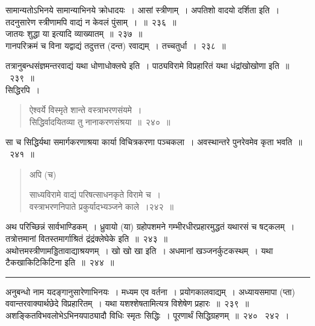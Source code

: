 \documentclass[11pt, openany]{book}
\begin{document}
सामान्यतोऽभिनये सामान्याभिनये क्रोधादयः~। आसां स्त्रीणाम्~। अपतिशो वादयो दर्शिता इति~। तदनुसारेण स्त्रीणामपि वाद्यं न केवलं पुंसाम्~।~॥~२३६~॥\\

जातयः शुद्धा या इत्यादि व्याख्यातम्~॥~२३७~॥\\

गानपरिक्रमं च विना यद्वाद्यं तदुत्तत्त (दन्त) रवाद्यम्~। तच्चतुर्धा~।~२३८~॥

\newpage

{\qt तत्रानुबन्धसंज्ञमन्तरवाद्यं यथा धोणाधोक्लघे इति~। पाठ्यविरामे विप्रहारितं यथा धंद्रांखोखोणा इति~॥~२३९~॥}\\

{\qt सिद्धिरपि~।}

\begin{quote}
{\na  ऐश्वर्ये विस्मृते शान्ते वस्त्राभरणसंयमे~।\\
 सिद्धिर्वादयितव्या तु नानाकरणसंश्रया~॥~२४०~॥}
\end{quote}

{\qt  सा च सिद्धिर्यथा समार्गकरणाश्रया कार्या विचित्रकरणा पञ्चकला~। अवस्थान्तरे पुनरेवमेव कृता भवति~॥~२४१~॥}\\

\begin{quote}
{\qt अपि (च) }

{\na  साध्यविरामे वाद्यं परिषत्साधनकृते विरामे च~। \\
 वस्त्राभरणनिपाते प्रकुर्यादभ्यञ्जने काले~।२४२~॥}
\end{quote}

{\qt अथ परिच्छिन्नं सार्वभाण्डिकम्~। ध्रुवायो (या) ग्रहोपशमने गम्भीरधीरप्रहारमुद्धतं यथारसं च षट्कलम्~। तत्रोत्तमानां वितस्तमार्गाश्रितं द्रंद्रंक्लेघेके इति~॥~२४३~॥}\\

{\qt अथोत्तमस्त्रीणामड्डितावाद्याश्रयणम्~। खो खो खा इति~। अधमानां खञ्जनर्कुटकस्थम्~। यथा टैकखाकिटिकिटिना इति~॥~२४४~॥}\\

\hrule

\vspace{2mm}
अनुबन्धो नाम यदङ्गानुसारेणाभिनयः~। मध्यम एव वर्तना~। प्रयोगकालवाद्यम्~। अध्यायसमापा (प्ता) ववान्तरवाक्यार्थछेदे विप्रहारितम्~। यथा यशश्शेषतामित्यत्र विशेषेण प्रहारः~॥~२३९~॥\\

अशङ्कितविभवलोभेऽभिनयपाठ्यादौ विधिः स्मृतः सिद्धिः~। पूरणार्थं सिद्धिग्रहणम्~॥~२४० \textendash\ २४२~।\\
\end{document}

